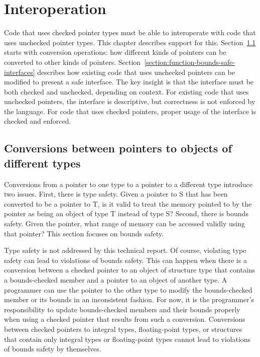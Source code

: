 
\newcommand{\dynamicboundscast}{\texttt{dynamic\_bounds\_cast}}
\newcommand{\dynamicboundscastinst}[2]{\texttt{dynamic\_bounds\_cast<#1>#2}}
\newcommand{\assumeboundscast}{\texttt{assume\_bounds\_cast}}
\newcommand{\assumeboundscastinst}[2]{\texttt{assume\_bounds\_cast<#1>#2}}

\chapter{Interoperation}
\label{chapter:interoperation}

Code that uses checked pointer types must be able to interoperate with
code that uses unchecked pointer types.  This chapter describes support
for this.  Section~\ref{section:pointer-casting} starts with
conversion operations: how different kinds of pointers can
be converted to other kinds of pointers.  
Section~\ref{section:function-bounds-safe-interfaces}
describes how existing code that uses unchecked pointers can be modified
to present a safe interface.  The key insight is that
the interface must be both checked and unchecked, depending on context.
For existing code that uses unchecked pointers, the interface is descriptive,
but correctness is not enforced by the language.  For code that uses checked
pointers, proper usage of the interface is checked and enforced.

\section{Conversions between pointers to objects of different types}
\label{section:pointer-casting}

Conversions from a pointer to one type to a pointer to a different type
introduce two issues. First, there is type safety. Given a pointer to S
that has been converted to be a pointer to T, is it valid to treat the
memory pointed to by the pointer as being an object of type T instead of
type S? Second, there is bounds safety. Given the pointer, what range of
memory can be accessed validly using that pointer? This section focuses on
bounds safety.

Type safety is not addressed by this technical report. Of course, violating
type safety can lead to violations of bounds safety. This can happen
when there is a conversion between a checked pointer to an object of
structure type that contains a bounds-checked member and a pointer
to an object of another type. A programmer can use the pointer to the
other type to modify the bounds-checked member or its bounds in an
inconsistent fashion. For now, it is the programmer's responsibility to
update bounds-checked members and their bounds properly when using a
checked pointer that results from such a conversion. Conversions between
checked pointers to integral types, floating-point types, or structures that
contain only integral types or floating-point types cannot lead to
violations of bounds safety by themselves.

